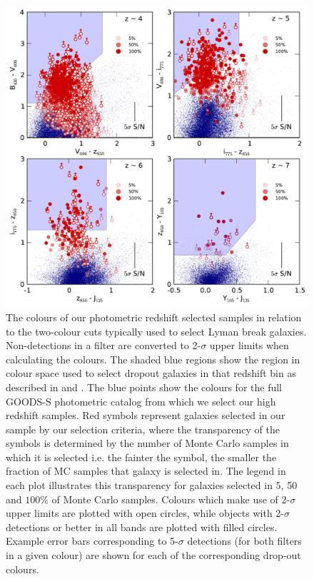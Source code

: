 \begin{figure}
\includegraphics[width=140mm]{plots/fig2.pdf}
\caption[The colours of photometric redshift selected samples in relation to the two-colour cuts typically used to select Lyman break galaxies.]{The colours of our photometric redshift selected samples in relation to the two-colour cuts typically used to select Lyman break galaxies. Non-detections in a filter are converted to 2-$\sigma$ upper limits when calculating the colours. The shaded blue regions show the region in colour space used to select dropout galaxies in that redshift bin as described in  \citet{2007ApJ...670..928B} and \citet{2012ApJ...754...83B}. The blue points show the colours for the full GOODS-S photometric catalog from which we select our high redshift samples. Red symbols represent galaxies selected in our sample by our selection criteria, where the transparency of the symbols is determined by the number of Monte Carlo samples in which it is selected i.e. the fainter the symbol, the smaller the fraction of MC samples that galaxy is selected in. The legend in each plot illustrates this transparency for galaxies selected in 5, 50 and $100\%$ of Monte Carlo samples. Colours which make use of 2-$\sigma$ upper limits are plotted with open circles, while objects with 2-$\sigma$ detections or better in all bands are plotted with filled circles. Example error bars corresponding to 5-$\sigma$ detections (for both filters in a given colour) are shown for each of the corresponding drop-out colours.}
\label{fig:colours}
\end{figure}

